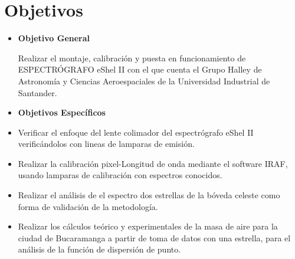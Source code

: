 \newpage
\chapter{Objetivos}


\begin{itemize}
\item \textbf{Objetivo General}

Realizar el montaje, calibración y puesta en funcionamiento de ESPECTRÓGRAFO eShel II con el que cuenta el Grupo Halley de Astronomía y Ciencias Aeroespaciales de la Universidad Industrial de Santander.\\

\item \textbf{Objetivos Específicos}
\end{itemize}

\begin{itemize}


\item Verificar el enfoque del lente colimador del espectrógrafo eShel II verificándolos con lineas de lamparas de emisión.


\item Realizar la calibración pixel-Longitud de onda mediante el software IRAF, usando lamparas de calibración con espectros conocidos.

\item Realizar el análisis de el espectro dos estrellas de la bóveda celeste como forma de validación de la metodología.

 \item Realizar los cálculos teórico y experimentales de la masa de aire para la ciudad de Bucaramanga a partir de toma de datos con una estrella, para el análisis de la función de dispersión de punto.

\end{itemize}
\newpage
